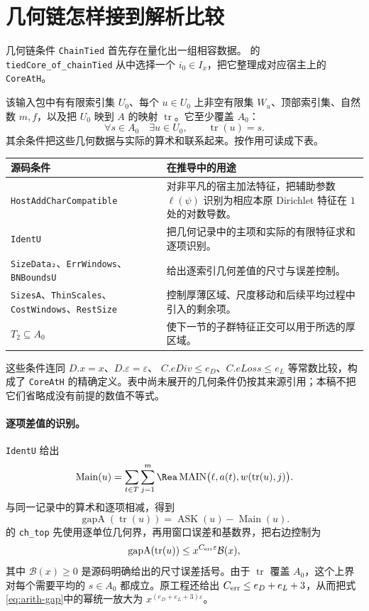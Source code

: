 \section{几何链怎样接到解析比较}
\label{sec:arith-coreath}
几何链条件 \texttt{ChainTied} 首先存在量化出一组相容数据。 的 \texttt{tiedCore\_of\_chainTied} 从中选择一个 $i_0\in I_x$，把它整理成对应宿主上的 \texttt{CoreAtH}。

该输入包中有有限索引集 $U_0$、每个 $u\in U_0$ 上非空有限集 $W_u$、顶部索引集、自然数 $m,f$，以及把 $U_0$ 映到 $A$ 的映射 $\operatorname{tr}$。它至少覆盖 $A_0$：
\[
\forall s\in A_0\quad\exists u\in U_0,
\qquad\operatorname{tr}(u)=s.
\]
其余条件把这些几何数据与实际的算术和联系起来。按作用可读成下表。

\begin{longtable}{@{}p{}p{}@{}}
\toprule
源码条件 & 在推导中的用途\\
\midrule
\endhead
\texttt{HostAddCharCompatible} & 对非平凡的宿主加法特征，把辅助参数 $\ell(\psi)$ 识别为相应本原 Dirichlet 特征在 $1$ 处的对数导数。\\
\texttt{IdentU} & 把几何记录中的主项和实际的有限特征求和逐项识别。\\
\texttt{SizeData₂}、\texttt{ErrWindows}、\texttt{BNBoundsU} & 给出逐索引几何差值的尺寸与误差控制。\\
\texttt{SizesA}、\texttt{ThinScales}、\texttt{CostWindows}、\texttt{RestSize} & 控制厚薄区域、尺度移动和后续平均过程中引入的剩余项。\\
$T_2\subseteq A_0$ & 使下一节的子群特征正交可以用于所选的厚区域。\\
\bottomrule
\end{longtable}

这些条件连同 $D.x=x$、$D.\varepsilon=\varepsilon$、
$C.eDiv\le e_D$、$C.eLoss\le e_L$ 等常数比较，构成了 \texttt{CoreAtH} 的精确定义。表中尚未展开的几何条件仍按其来源引用；本稿不把它们省略成没有前提的数值不等式。

\paragraph{逐项差值的识别。}
\texttt{IdentU} 给出
\[
\operatorname{Main}(u)
=\sum_{t\in T}\sum_{j=1}^{m}
\Rea\operatorname{MAIN}\bigl(\ell,a(t),w(\operatorname{tr}(u),j)\bigr).
\]
与同一记录中的算术和逐项相减，得到
\[
\operatorname{gapA}(\operatorname{tr}(u))
=\operatorname{ASK}(u)-\operatorname{Main}(u).
\]
 的 \texttt{ch\_top} 先使用逐单位几何界，再用窗口误差和基数界，把右边控制为
\begin{equation}
\operatorname{gapA}(\operatorname{tr}(u))
\le x^{C_{\rm err}\varepsilon}\mathcal B(x),
\label{eq:arith-gap}
\end{equation}
其中 $\mathcal B(x)\ge0$ 是源码明确给出的尺寸误差括号。由于 $\operatorname{tr}$ 覆盖 $A_0$，这个上界对每个需要平均的 $s\in A_0$ 都成立。原工程还给出
$C_{\rm err}\le e_D+e_L+3$，从而把式\eqref{eq:arith-gap}中的幂统一放大为 $x^{(e_D+e_L+3)\varepsilon}$。

